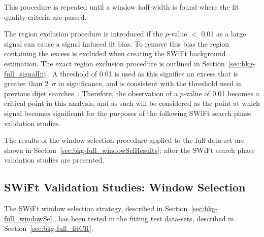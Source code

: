 \noindent
This procedure is repeated until a window half-width is found where the fit quality criteria are passed.

The region exclusion procedure is introduced if the \bh{} \mbox{$p$-value} $<$ 0.01 as a large signal can cause a signal induced fit bias.
To remove this bias the region containing the excess is excluded when creating the SWiFt background estimation.
The exact region exclusion procedure is outlined in Section~\ref{sec:bkg-full_signalInj}.
A threshold of 0.01 is used as this signifies an excess that is greater than 2~$\sigma$ in significance,
and is consistent with the threshold used in previous dijet searches~\cite{det-thesis_kate}.
Therefore, the observation of a \bh{} \mbox{$p$-value} of 0.01 becomes a critical point in this analysis,
and as such will be considered as the point at which signal becomes significant for the purposes of the following SWiFt search phase validation studies.

The results of the window selection procedure applied to the full data-set are shown in Section~\ref{sec:bkg-full_windowSelResults};
after the SWiFt search phase validation studies are presented.



\subsection{SWiFt Validation Studies: Window Selection}
\label{sec:bkg-full_windowSelTests} 

The SWiFt window selection strategy, described in Section~\ref{sec:bkg-full_windowSel}, has been tested in the fitting test data-sets, described in Section~\ref{sec:bkg-full_fitCR}.


